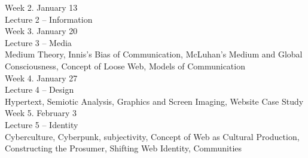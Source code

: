 \documentclass[10pt]{article}
\begin{document}
{Week 2. January 13 \\
Lecture 2 – Information \\

Week 3. January 20 \\
Lecture 3 – Media \\
Medium Theory, Innis’s Bias of Communication, McLuhan’s Medium and Global Consciousness, Concept of Loose Web, Models of Communication \\

Week 4. January 27 \\
Lecture 4 – Design \\
Hypertext, Semiotic Analysis, Graphics and Screen Imaging, Website Case Study \\

Week 5. February 3 \\
Lecture 5 – Identity \\
Cyberculture, Cyberpunk,  subjectivity, Concept of Web as Cultural Production, Constructing the Prosumer, Shifting Web Identity, Communities \\

}
\end{document}
